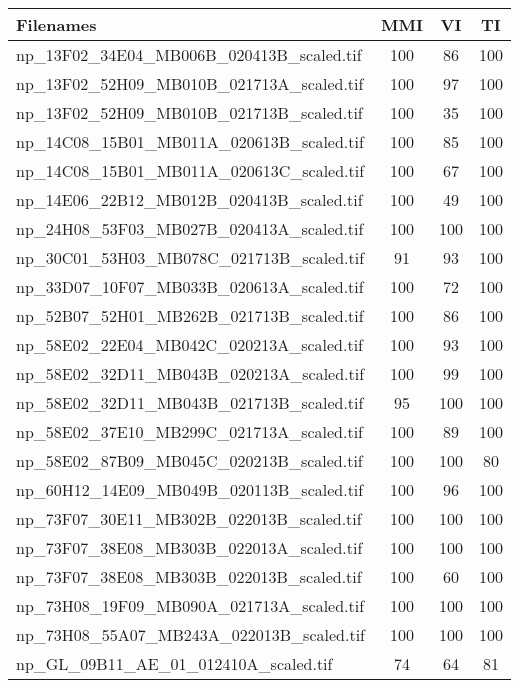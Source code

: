 \begin{tabular}{lccc}
\hline
 ﻿Filenames                               & MMI   & VI    & TI    \\ \hline \hline
 np\_13F02\_34E04\_MB006B\_020413B\_scaled.tif & 100   & 86    & 100   \\
 np\_13F02\_52H09\_MB010B\_021713A\_scaled.tif & 100   & 97    & 100   \\
 np\_13F02\_52H09\_MB010B\_021713B\_scaled.tif & 100   & 35    & 100   \\
 np\_14C08\_15B01\_MB011A\_020613B\_scaled.tif & 100   & 85    & 100   \\
 np\_14C08\_15B01\_MB011A\_020613C\_scaled.tif & 100   & 67    & 100   \\
 np\_14E06\_22B12\_MB012B\_020413B\_scaled.tif & 100   & 49    & 100   \\
 np\_24H08\_53F03\_MB027B\_020413A\_scaled.tif & 100   & 100   & 100   \\
 np\_30C01\_53H03\_MB078C\_021713B\_scaled.tif & 91    & 93    & 100   \\
 np\_33D07\_10F07\_MB033B\_020613A\_scaled.tif & 100   & 72    & 100   \\
 np\_52B07\_52H01\_MB262B\_021713B\_scaled.tif & 100   & 86    & 100   \\
 np\_58E02\_22E04\_MB042C\_020213A\_scaled.tif & 100   & 93    & 100   \\
 np\_58E02\_32D11\_MB043B\_020213A\_scaled.tif & 100   & 99    & 100   \\
 np\_58E02\_32D11\_MB043B\_021713B\_scaled.tif & 95    & 100   & 100   \\
 np\_58E02\_37E10\_MB299C\_021713A\_scaled.tif & 100   & 89    & 100   \\
 np\_58E02\_87B09\_MB045C\_020213B\_scaled.tif & 100   & 100   & 80    \\
 np\_60H12\_14E09\_MB049B\_020113B\_scaled.tif & 100   & 96    & 100   \\
 np\_73F07\_30E11\_MB302B\_022013B\_scaled.tif & 100   & 100   & 100   \\
 np\_73F07\_38E08\_MB303B\_022013A\_scaled.tif & 100   & 100   & 100   \\
 np\_73F07\_38E08\_MB303B\_022013B\_scaled.tif & 100   & 60    & 100   \\
 np\_73H08\_19F09\_MB090A\_021713A\_scaled.tif & 100   & 100   & 100   \\
 np\_73H08\_55A07\_MB243A\_022013B\_scaled.tif & 100   & 100   & 100   \\
 np\_GL\_09B11\_AE\_01\_012410A\_scaled.tif     & 74    & 64    & 81    \\

\end{tabular}
